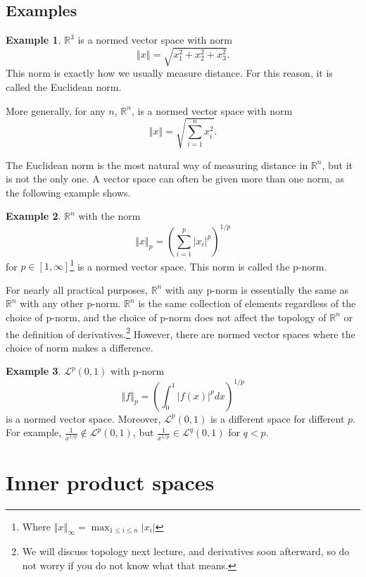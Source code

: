 \documentclass[12pt,reqno]{amsart}
\theoremstyle{definition}
\newtheorem{example}{Example}[section]
\def\R{\mathbb{R}}
\newcommand{\norm}[1]{\left\Vert {#1} \right\Vert}
\begin{document}
\subsection{Examples}
\begin{example}
  $\R^3$ is a normed vector space with norm
  \[ \norm{x} = \sqrt{x_1^2 + x_2^2 + x_3^2}. \] 
  This norm is exactly
  how we usually measure distance. For this reason, it is called the
  Euclidean norm.

  More generally, for any $n$, $\R^n$, is a normed vector space with
  norm 
  \[ \norm{x} = \sqrt{\sum_{i=1}^n x_i^2 }. \]
\end{example}
The Euclidean norm is the most natural way of measuring distance in
$\R^n$, but it is not the only one.  A vector space can often be given
more than one norm, as the following example shows.
\begin{example}
  $\R^n$ with the norm 
  \[ \norm{x}_p = \left( \sum_{i=1}^p |x_i|^p \right)^{1/p} \]
  for $p \in [1,\infty]$\footnote{Where $\norm{x}_\infty = \max_{1\leq
      i \leq n} |x_i| $} is a normed vector space. This norm is called
  the p-norm. 
\end{example}
For nearly all practical purposes, $\R^n$ with any p-norm is
essentially the same as $\R^n$ with any other p-norm. $\R^n$ is the
same collection of elements regardless of the choice of p-norm, and
the choice of p-norm does not affect the topology of $\R^n$ or the
definition of derivatives.\footnote{We will discuss topology next
  lecture, and derivatives soon afterward, so do not worry if you do
  not know what that means.} However, there are normed vector spaces
where the choice of norm makes a difference.
\begin{example}
  $\mathcal{L}^p(0,1)$ with p-norm 
  \[ \norm{f}_p = \left(\int_0^1 |f(x)|^p dx\right)^{1/p} \] is a
  normed vector space. Moreover, $\mathcal{L}^p(0,1)$ is a different
  space for different $p$. For example, $\frac{1}{x^{1/p}} \not\in
  \mathcal{L}^p(0,1)$, but $\frac{1}{x^{1/p}} \in \mathcal{L}^q(0,1)$
  for $q < p$. 
\end{example}

\section{Inner product spaces}
\end{document}
